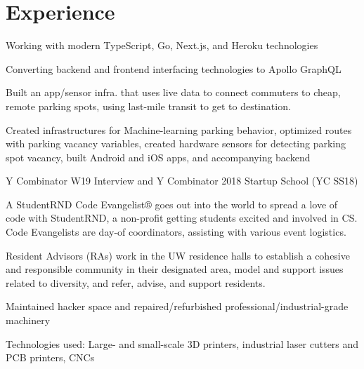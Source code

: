 \documentclass[]{deedy-resume-openfont}
\begin{document}
\section{Experience}
\hfill {}
\begin{tightemize}
	\item Working with modern TypeScript, Go, Next.js, and Heroku technologies
	\item Converting backend and frontend interfacing technologies to Apollo GraphQL
\end{tightemize}
\sectionsep
{}\hfill {}
\begin{tightemize}
	\item Built an app/sensor infra. that uses live data to connect commuters to cheap, remote parking spots, using last-mile transit to get to destination.
	\item Created infrastructures for Machine-learning parking behavior, optimized routes with parking vacancy variables, created hardware sensors for detecting parking spot vacancy, built Android and iOS apps, and accompanying backend
	\item Y Combinator W19 Interview and Y Combinator 2018 Startup School (YC SS18)
\end{tightemize}
\sectionsep
{}\hfill {}
\begin{tightemize}
	\item A StudentRND Code Evangelist® goes out into the world to spread a love of code with StudentRND, a non-profit getting students excited and involved in CS. Code Evangelists are day-of coordinators, assisting with various event logistics.
\end{tightemize}
\sectionsep
{}\hfill {}
\begin{tightemize}
	\item Resident Advisors (RAs) work in the UW residence halls to establish a cohesive and responsible community in their designated area, model and support issues related to diversity, and refer, advise, and support residents.
\end{tightemize}
\sectionsep
{}\hfill {}
\begin{tightemize}
	\item Maintained hacker space and repaired/refurbished professional/industrial-grade machinery
	\item Technologies used: Large- and small-scale 3D printers, industrial laser cutters and PCB printers, CNCs
\end{tightemize}
\sectionsep
%
%
\end{document}
